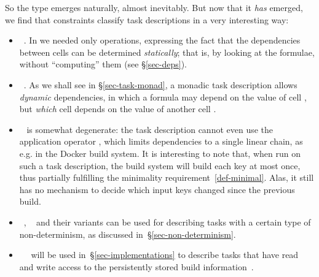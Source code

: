 So the type  emerges naturally, almost inevitably.  But now that
it \emph{has} emerged, we find that constraints  classify task descriptions
in a very interesting way:
\begin{itemize}
\item {}~. In  we needed only 
  operations, expressing the fact that the dependencies between cells can be
  determined \emph{statically}; that is, by looking at the formulae, without
  ``computing'' them (see \S\ref{sec-deps}).
\item {}~. As we shall see in \S\ref{sec-task-monad}, a monadic task
  description allows \emph{dynamic} dependencies, in which a formula may depend
  on the value of cell , but \emph{which} cell  depends on the
  value of another cell .
\item {}~ is somewhat degenerate: the task description cannot
  even use the application operator \hs{<*>}, which limits dependencies to a
  single linear chain, as e.g. in the Docker build system. It is interesting to
  note that, when run on such a task description, the  build system
  will build each key at most once, thus partially fulfilling the minimality
  requirement~\ref{def-minimal}. Alas, it still has no mechanism to decide which
  input keys changed since the previous build.
\item {}~, ~ and their
  variants can be used for describing tasks with a certain type of
  non-determinism, as discussed in~\S\ref{sec-non-determinism}.
\item {}~~ will be used
  in~\S\ref{sec-implementations} to describe tasks that have read and write
  access to the persistently stored build information~.
\end{itemize}

%
%
%

